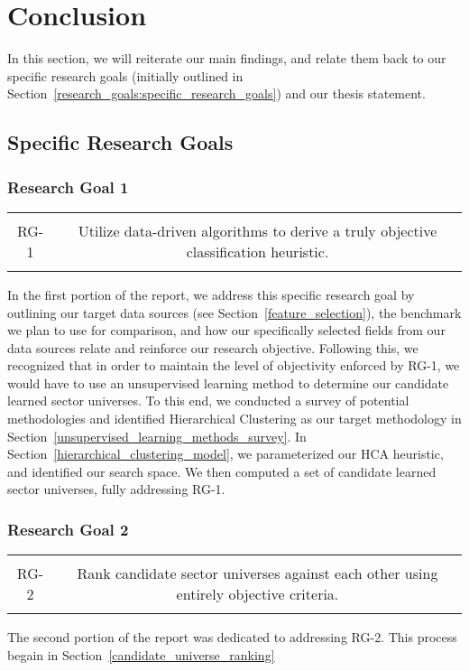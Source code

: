 \documentclass[../main.tex]{subfiles}
\begin{document}
    
\chapter{Conclusion}
    
In this section, we will reiterate our main findings, and relate them back to our specific research goals (initially outlined in Section~\ref{research_goals:specific_research_goals}) and our thesis statement.

\section{Specific Research Goals}

\subsection{Research Goal 1}

\begin{table}[h!]
    \centering
    \begin{tabular}{| c | c |}
        \hline
        &  \\
        RG-1 & Utilize data-driven algorithms to derive a truly objective classification heuristic. \\
        & \\
        \hline
    \end{tabular}
\end{table}

In the first portion of the report, we address this specific research goal by outlining our target data sources (see Section~\ref{feature_selection}), the benchmark we plan to use for comparison, and how our specifically selected fields from our data sources relate and reinforce our research objective. Following this, we recognized that in order to maintain the level of objectivity enforced by RG-1, we would have to use an unsupervised learning method to determine our candidate learned sector universes. To this end, we conducted a survey of potential methodologies and identified Hierarchical Clustering as our target methodology in Section~\ref{unsupervised_learning_methods_survey}. In Section~\ref{hierarchical_clustering_model}, we parameterized our HCA heuristic, and identified our search space. We then computed a set of candidate learned sector universes, fully addressing RG-1.

\subsection{Research Goal 2}

\begin{table}[h!]
    \centering
    \begin{tabular}{| c | c |}
        \hline
        &  \\
        RG-2 & Rank candidate sector universes against each other using entirely objective criteria. \\
        & \\
        \hline
    \end{tabular}
\end{table}

The second portion of the report was dedicated to addressing RG-2. This process begain in Section~\ref{candidate_universe_ranking}
\end{document}
